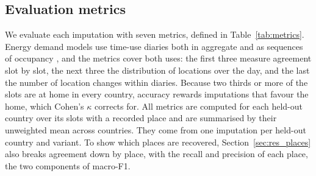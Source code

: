 \documentclass[a4paper]{article}
\begin{document}
\subsection{Evaluation metrics}
\label{sec:metrics}

We evaluate each imputation with seven metrics, defined in Table~\ref{tab:metrics}. Energy demand models use time-use diaries both in aggregate and as sequences of occupancy \parencite{richardsonHighresolutionDomesticBuilding2008,widenCombinedMarkovchainBottomup2009,aertsMethodIdentificationModelling2014}, and the metrics cover both uses: the first three measure agreement slot by slot, the next three the distribution of locations over the day, and the last the number of location changes within diaries. Because two thirds or more of the slots are at home in every country, accuracy rewards imputations that favour the home, which Cohen's $\kappa$ corrects for. All metrics are computed for each held-out country over its slots with a recorded place and are summarised by their unweighted mean across countries. They come from one imputation per held-out country and variant. To show which places are recovered, Section~\ref{sec:res_places} also breaks agreement down by place, with the recall and precision of each place, the two components of macro-F1.
\end{document}
